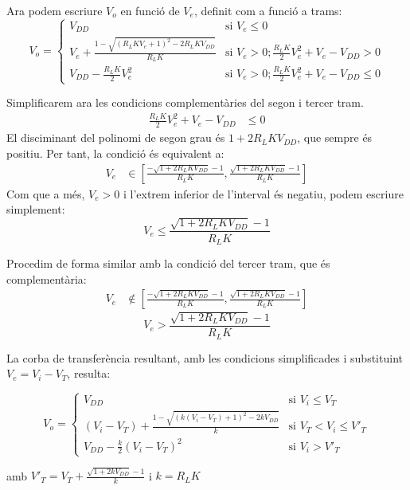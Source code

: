 \finishpage
\startpage


Ara podem escriure $V_o$ en funció de $V_e$, definit com a funció a trams:
%
\begin{equation*}
  V_o = \begin{cases}
    V_{DD} & \text{si $V_e \leq 0$} \\
    V_e + \frac{1 - \sqrt{\left(R_L K V_e + 1\right)^2 - 2 R_L K V_{DD}}}{R_L K} & \text{si $V_e > 0; \frac{R_L K}{2} V_e^2 + V_e - V_{DD} > 0$} \\
    V_{DD} - \frac{R_L K}{2} V_e^2 & \text{si $V_e > 0; \frac{R_L K}{2} V_e^2 + V_e - V_{DD} \leq 0$}
  \end{cases}
\end{equation*}

Simplificarem ara les condicions complementàries del segon i tercer tram.
%
\begin{align*}
  \frac{R_L K}{2} V_e^2 + V_e - V_{DD} &\leq 0
\end{align*}
%
El disciminant del polinomi de segon grau és $1 + 2 R_L K V_{DD}$, que sempre
és positiu. Per tant, la condició és equivalent a:
%
\begin{align*}
  V_e &\in \left[ \frac{-\sqrt{1 + 2 R_L K V_{DD}} -1}{R_L K}, \frac{\sqrt{1 + 2 R_L K V_{DD}} -1}{R_L K} \right]
\end{align*}
%
Com que a més, $V_e > 0$ i l'extrem inferior de l'interval és negatiu, podem escriure simplement:
%
\begin{equation*}
  V_e \leq \frac{\sqrt{1 + 2 R_L K V_{DD}} -1}{R_L K}
\end{equation*}

Procedim de forma similar amb la condició del tercer tram, que és complementària:
%
\begin{align*}
  V_e &\notin \left[ \frac{-\sqrt{1 + 2 R_L K V_{DD}} -1}{R_L K}, \frac{\sqrt{1 + 2 R_L K V_{DD}} -1}{R_L K} \right]
\end{align*}
\begin{equation*}
  V_e > \frac{\sqrt{1 + 2 R_L K V_{DD}} -1}{R_L K}
\end{equation*}

La corba de transferència resultant, amb les condicions simplificades
i substituint $V_e = V_i - V_T$, resulta:

\begin{equation*}
  V_o = \begin{cases}
    V_{DD} & \text{si $V_i \leq V_T$} \\
    \left(V_i - V_T\right) + \frac{1 - \sqrt{\left(k \left(V_i - V_T\right) + 1\right)^2 - 2 k V_{DD}}}{k} & \text{si $V_T < V_i \leq V'_T$} \\
    V_{DD} - \frac{k}{2} \left(V_i - V_T\right)^2 & \text{si $V_i > V'_T$}
  \end{cases}
\end{equation*}
%
\begin{center}
amb $V'_T = V_T + \frac{\sqrt{1 + 2 k V_{DD}} -1}{k}$ i $k = R_L K$
\end{center}


\finishpage

